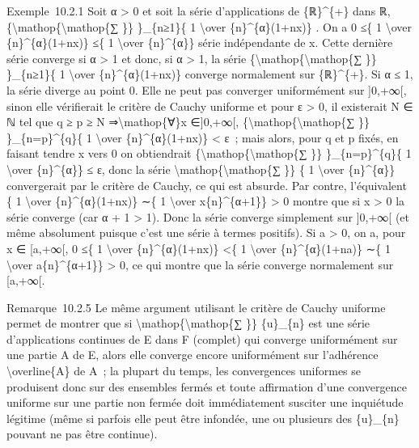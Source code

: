 \documentclass[]{article}
\begin{document}
Exemple~10.2.1 Soit α \textgreater{} 0 et soit la série d'applications
de \{ℝ\}\^{}\{+\} dans ℝ,
\{\textbackslash{}mathop\{\textbackslash{}mathop\{∑ \}\} \}\_\{n≥1\}\{ 1
\textbackslash{}over \{n\}\^{}\{α\}(1+nx)\} . On a 0 ≤\{ 1
\textbackslash{}over \{n\}\^{}\{α\}(1+nx)\} ≤\{ 1 \textbackslash{}over
\{n\}\^{}\{α\}\} série indépendante de x. Cette dernière série converge
si α \textgreater{} 1 et donc, si α \textgreater{} 1, la série
\{\textbackslash{}mathop\{\textbackslash{}mathop\{∑ \}\} \}\_\{n≥1\}\{ 1
\textbackslash{}over \{n\}\^{}\{α\}(1+nx)\} converge normalement sur
\{ℝ\}\^{}\{+\}. Si α ≤ 1, la série diverge au point 0. Elle ne peut pas
converger uniformément sur {]}0,+∞{[}, sinon elle vérifierait le critère
de Cauchy uniforme et pour ε \textgreater{} 0, il existerait N ∈ ℕ tel
que q ≥ p ≥ N ⇒\textbackslash{}mathop\{∀\}x ∈{]}0,+∞{[},
\{\textbackslash{}mathop\{\textbackslash{}mathop\{∑ \}\}
\}\_\{n=p\}\^{}\{q\}\{ 1 \textbackslash{}over \{n\}\^{}\{α\}(1+nx)\}
\textless{} ε~; mais alors, pour q et p fixés, en faisant tendre x vers
0 on obtiendrait \{\textbackslash{}mathop\{\textbackslash{}mathop\{∑
\}\} \}\_\{n=p\}\^{}\{q\}\{ 1 \textbackslash{}over \{n\}\^{}\{α\}\} ≤ ε,
donc la série \textbackslash{}mathop\{\textbackslash{}mathop\{∑ \}\} \{
1 \textbackslash{}over \{n\}\^{}\{α\}\} convergerait par le critère de
Cauchy, ce qui est absurde. Par contre, l'équivalent \{ 1
\textbackslash{}over \{n\}\^{}\{α\}(1+nx)\} ∼\{ 1 \textbackslash{}over
x\{n\}\^{}\{α+1\}\} \textgreater{} 0 montre que si x \textgreater{} 0 la
série converge (car α + 1 \textgreater{} 1). Donc la série converge
simplement sur {]}0,+∞{[} (et même absolument puisque c'est une série à
termes positifs). Si a \textgreater{} 0, on a, pour x ∈ {[}a,+∞{[}, 0
≤\{ 1 \textbackslash{}over \{n\}\^{}\{α\}(1+nx)\} \textless{}\{ 1
\textbackslash{}over \{n\}\^{}\{α\}(1+na)\} ∼\{ 1 \textbackslash{}over
a\{n\}\^{}\{α+1\}\} \textgreater{} 0, ce qui montre que la série
converge normalement sur {[}a,+∞{[}.

Remarque~10.2.5 Le même argument utilisant le critère de Cauchy uniforme
permet de montrer que si
\textbackslash{}mathop\{\textbackslash{}mathop\{∑ \}\} \{u\}\_\{n\} est
une série d'applications continues de E dans F (complet) qui converge
uniformément sur une partie A de E, alors elle converge encore
uniformément sur l'adhérence \textbackslash{}overline\{A\} de A~; la
plupart du temps, les convergences uniformes se produisent donc sur des
ensembles fermés et toute affirmation d'une convergence uniforme sur une
partie non fermée doit immédiatement susciter une inquiétude légitime
(même si parfois elle peut être infondée, une ou plusieurs des
\{u\}\_\{n\} pouvant ne pas être continue).
\end{document}
